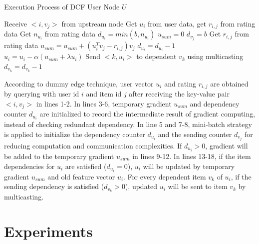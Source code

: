 \documentclass{llncs}
\begin{document}
\begin{algorithm}
\caption{Execution Process of DCF User Node $U$}
\label{code:DCF}
\begin{algorithmic}[1]
\STATE Receive $<i, v_j>$ from upstream node
\STATE Get $u_i$ from user data, get $r_{i,j}$ from rating data
\STATE Get $n_{u_i}$ from rating data
\STATE $d_{u_i} = min(b,n_{u_i})$
\STATE $u_{sum} = 0$
\ENDIF
{}
\STATE $d_{v_j} = b$
\ENDIF
{}
\STATE Get $r_{i,j}$ from rating data
\STATE $u_{sum} = u_{sum} + (u_i^T v_j - r_{i,j})v_j$
\STATE $d_{u_i} = d_{u_i} - 1$
\ENDIF
{}
\STATE $u_i = u_i - \alpha (u_{sum} + \lambda u_i)$
\STATE Send $<k, u_i>$ to dependent $v_k$ using multicasting
\STATE $d_{v_k} = d_{v_k} - 1$
\ENDIF
\ENDFOR
\ENDIF
\end{algorithmic}
\end{algorithm}

According to dummy edge technique, user vector $u_i$ and rating $r_{i,j}$ are obtained by querying with user id $i$ and item id $j$ after receiving the key-value pair $<i, v_j>$ in lines 1-2. In lines 3-6, temporary gradient $u_{sum}$ and dependency counter $d_{u_i}$ are initialized to record the intermediate result of gradient computing, instead of checking redundant dependency. In line 5 and 7-8, mini-batch strategy is applied to initialize the dependency counter $d_{u_i}$ and the sending counter $d_{v_j}$ for reducing computation and communication complexities. If $d_{u_i} > 0$, gradient will be added to the temporary gradient $u_{sum}$ in lines 9-12. In lines 13-18, if the item dependencies for $u_i$ are satisfied ($d_{u_i} = 0$), $u_i$ will be updated by temporary gradient $u_{sum}$ and old feature vector $u_i$. For every dependent item $v_k$ of $u_i$, if the sending dependency is satisfied ($d_{v_k} > 0$), updated $u_i$ will be sent to item $v_k$ by multicasting.
%
\vspace{-15pt}
\section{Experiments}
\label{sec:experiment}
\vspace{-10pt}
\end{document}

